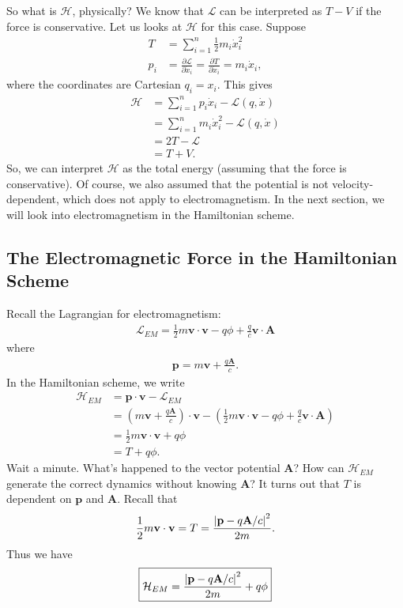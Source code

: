 \documentclass{book}
\theoremstyle{definition}
\newcommand{\p}{\partial}
\newcommand{\lag}{\mathcal{L}}
\newcommand{\ham}{\mathcal{H}}
\newcommand{\f}[2]{\frac{#1}{#2}}
\newcommand{\lp}{\left(}
\newcommand{\rp}{\right)}
\begin{document}
So what is $\ham$, physically? We know that $\lag$ can be interpreted as $T - V$ if the force is conservative. Let us looks at $\ham$ for this case. Suppose
\begin{align}
T &= \sum_{i=1}^n \f{1}{2}m_i \dot{x}_i^2 \\ p_i &= \f{\p \lag}{\p \dot{x}_i} = \f{\p T}{\p \dot{x}_i} = m_i \dot{x}_i,
\end{align}
where the coordinates are Cartesian $q_i = x_i$. This gives
\begin{align}
\ham 
&= \sum^n_{i=1}p_i \dot{x}_i - \lag(q,\dot{x})\\
&= \sum^n_{i=1}m_i \dot{x}_i^2 - \lag(q,\dot{x})\\
&= 2T - \lag\\
&= T + V.
\end{align}
So, we can interpret $\ham$ as the total energy (assuming that the force is conservative). Of course, we also assumed that the potential is not velocity-dependent, which does not apply to electromagnetism. In the next section, we will look into electromagnetism in the Hamiltonian scheme.
















\subsection{The Electromagnetic Force in the Hamiltonian Scheme}
Recall the Lagrangian for electromagnetism:
\begin{align}
\lag_{EM} = \f{1}{2}m\mathbf{v}\cdot\mathbf{v} -q\phi + \f{q}{c}\mathbf{v}\cdot\mathbf{A}
\end{align}
where 
\begin{align}
\mathbf{p} = m\mathbf{v} + \f{q\mathbf{A}}{c}.
\end{align}
In the Hamiltonian scheme, we write
\begin{align}
\ham_{EM} 
&= \mathbf{p}\cdot \mathbf{v} - \lag_{EM} \\
&= \lp m\mathbf{v} + \f{q\mathbf{A}}{c} \rp \cdot \mathbf{v} - \lp \f{1}{2}m\mathbf{v}\cdot\mathbf{v} -q\phi + \f{q}{c}\mathbf{v}\cdot\mathbf{A} \rp\\
&= \f{1}{2}m\mathbf{v}\cdot\mathbf{v} + q\phi\\
&= T + q\phi.
\end{align}
Wait a minute. What's happened to the vector potential $\mathbf{A}$? How can $\ham_{EM}$ generate the correct dynamics without knowing $\mathbf{A}$? It turns out that $T$ is dependent on $\mathbf{p}$ and $\mathbf{A}$. Recall that
\begin{align}
\f{1}{2}m\mathbf{v}\cdot\mathbf{v} = T = \f{\abs{\mathbf{p} - q\mathbf{A}/c}^2}{2m}.
\end{align}
Thus we have
\begin{align}
\boxed{\ham_{EM} = \f{\abs{\mathbf{p} - q\mathbf{A}/c}^2}{2m} + q\phi}
\end{align}
\end{document}
